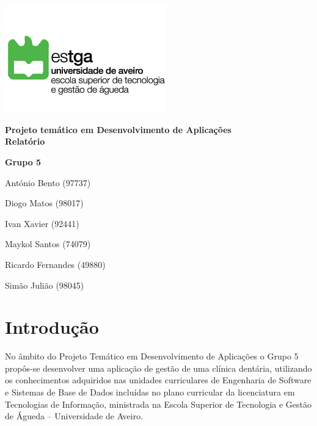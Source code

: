 \documentclass[11pt,a4paper,twoside]{report}
\begin{document}


\begin{titlepage}
	\centering
	\vfill
	\includegraphics[width=7cm]{image/ESTGA} %
	\vfill
	
	{\bfseries\Large
		Projeto temático em Desenvolvimento de Aplicações\\
		Relatório \\
		\vskip2cm
	}    
	
	\vfill
	\textbf{Grupo 5}
	
	António Bento (97737)
	
	Diogo Matos (98017)
	
	Ivan Xavier (92441)
	
	Maykol Santos (74079)
	
	Ricardo Fernandes (49880)
	
	Simão Julião (98045)
	\vfill
\end{titlepage}



	\tableofcontents

\listoffigures
\newpage\null\thispagestyle{empty}\newpage
{}





\chapter{Introdução}

No âmbito do Projeto Temático em Desenvolvimento de Aplicações o Grupo 5 propôs-se desenvolver uma aplicação de gestão de uma clínica dentária, utilizando os conhecimentos adquiridos nas unidades curriculares de Engenharia de Software e Sistemas de Base de Dados incluídas no plano curricular da licenciatura em Tecnologias de Informação, ministrada na Escola Superior de Tecnologia e Gestão de Águeda – Universidade de Aveiro.
\end{document}
